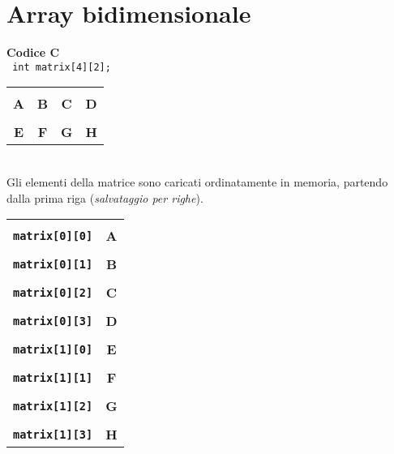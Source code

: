 \documentclass[../main.tex]{subfiles}
\begin{document}
\section{Array bidimensionale}
\textbf{Codice C} \\
\texttt{
    int matrix[4][2];
}
\begin{table}[h!]
    \setlength{\tabcolsep}{12pt}
    \renewcommand{\arraystretch}{1.5}

    \vspace*{-7mm}
    \begin{tabular}{ c @{\hskip 1cm} c @{\hskip 1cm} c @{\hskip 1cm} c @{\hskip 1cm} }
        \multicolumn{1}{p{2cm}}{} & \multicolumn{1}{p{2cm}}{} & \multicolumn{1}{p{2cm}}{} & \multicolumn{1}{p{2cm}}{} \\
        \rowcolor{gray!30}
        \textbf{A} & \textbf{B} & \textbf{C} & \textbf{D} \\
        \\[-5mm]
        \rowcolor{gray!30}
        \textbf{E} & \textbf{F} & \textbf{G} & \textbf{H} \\
    \end{tabular}
\end{table}
\\ Gli elementi della matrice sono caricati ordinatamente in memoria,
partendo dalla prima riga (\textit{salvataggio per righe}). \\
\begin{table}[h!]
    \setlength{\tabcolsep}{12pt}
    \renewcommand{\arraystretch}{1.5}

    \vspace*{-1cm}
    \begin{tabular}{ c c }
        \multicolumn{1}{p{2cm}}{} & \multicolumn{1}{p{2cm}}{} \\
        \textbf{\texttt{matrix[0][0]}} & \cellcolor{gray!30} \textbf{A} \\
        \\[-5mm]
        \textbf{\texttt{matrix[0][1]}} & \cellcolor{gray!30} \textbf{B} \\
        \\[-5mm]
        \textbf{\texttt{matrix[0][2]}} & \cellcolor{gray!30} \textbf{C} \\
        \\[-5mm]
        \textbf{\texttt{matrix[0][3]}} & \cellcolor{gray!30} \textbf{D} \\
        \\[-5mm]
        \textbf{\texttt{matrix[1][0]}} & \cellcolor{gray!30} \textbf{E} \\
        \\[-5mm]
        \textbf{\texttt{matrix[1][1]}} & \cellcolor{gray!30} \textbf{F} \\
        \\[-5mm]
        \textbf{\texttt{matrix[1][2]}} & \cellcolor{gray!30} \textbf{G} \\
        \\[-5mm]
        \textbf{\texttt{matrix[1][3]}} & \cellcolor{gray!30} \textbf{H} \\
    \end{tabular}
\end{table}
\end{document}
